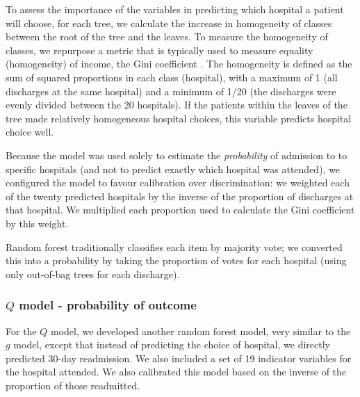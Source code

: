 \documentclass[]{article}\usepackage[]{graphicx}\usepackage[]{color}
\begin{document}
To assess the importance of the variables in predicting which hospital a patient will choose, for each tree, we calculate the increase in homogeneity of classes between the root of the tree and the leaves. To measure the homogeneity of classes, we repurpose a metric that is typically used to measure equality (homogeneity) of income, the Gini coefficient \cite{gini_variabilita_1912}. The homogeneity is defined as the sum of squared proportions in each class (hospital), with a maximum of 1 (all discharges at the same hospital) and a minimum of 1/20 (the discharges were evenly divided between the 20 hospitals). If the patients within the leaves of the tree made relatively homogeneous hospital choices, this variable predicts hospital choice well.

Because the model was used solely to estimate the \emph{probability} of admission to to specific hospitals (and not to predict exactly which hospital was attended), we configured the model to favour calibration over discrimination: we weighted each of the twenty predicted hospitals by the inverse of the proportion of discharges at that hospital. We multiplied each proportion used to calculate the Gini coefficient by this weight.

Random forest traditionally classifies each item by majority vote; we converted this into a probability by taking the proportion of votes for each hospital (using only out-of-bag trees for each discharge).

\subsubsection{\(Q\) model - probability of outcome}
For the  \(Q\) model, we developed another random forest model, very similar to the \(g\) model, except that instead of predicting the choice of hospital, we directly predicted 30-day readmission. We also included a set of 19 indicator variables for the hospital attended. We also calibrated this model based on the inverse of the proportion of those readmitted.
\end{document}
